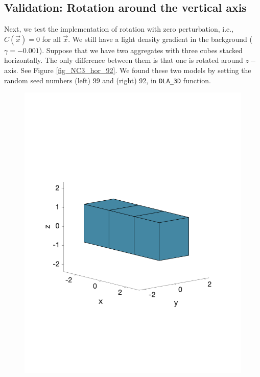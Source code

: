 \subsection{Validation: Rotation around the vertical axis}
Next, we test the implementation of rotation with zero perturbation, 
i.e.,  $C(\vec{x}) = 0$ for all $\vec{x}$. 
We still have a light density gradient in the background ($\gamma = - 0.001$). 
Suppose that we have two aggregates with three cubes stacked horizontally.
The only difference between them is that one is rotated around $z-$axis. 
See Figure \ref{fig_NC3_hor_92}. 
We found these two models by setting the random seed numbers (left) 99 
and (right) 92, in \verb+DLA_3D+ function. 
    \begin{figure}[h]
    	\begin{center}
    		\vspace{0.5cm}
			\includegraphics[scale=0.35]{./figures/fig_NC3_hor}		
			\hspace{20mm}

\end{center}
\end{figure}
